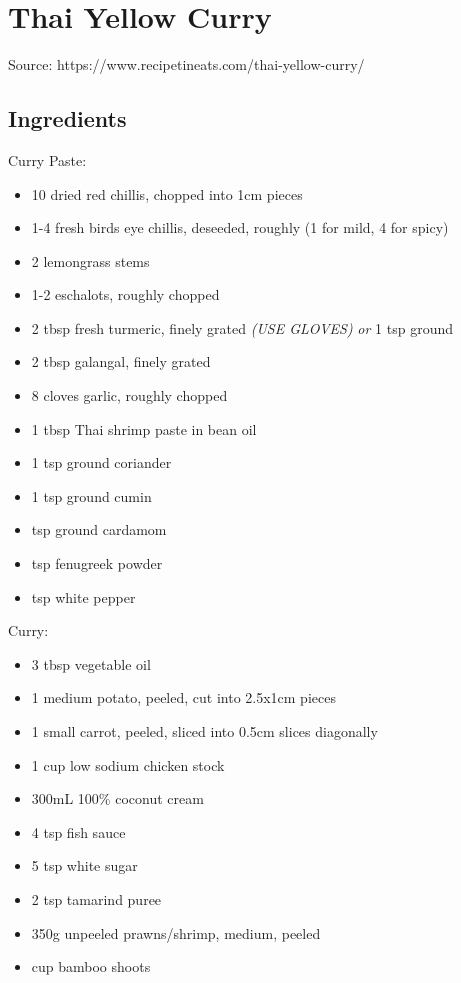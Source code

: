 \section{Thai Yellow Curry}

  
  Source: https://www.recipetineats.com/thai-yellow-curry/
    
  \subsection{Ingredients}
    
  Curry Paste:
  
  \begin{itemize}
    \item 10 dried red chillis, chopped into 1cm pieces
    \item 1-4 fresh birds eye chillis, deseeded, roughly (1 for mild, 4 for spicy)
    \item 2 lemongrass stems
    \item 1-2 eschalots, roughly chopped
    \item 2 tbsp fresh turmeric, finely grated \emph{(USE GLOVES)} \emph{or} 1  tsp ground
    \item 2 tbsp galangal, finely grated
    \item 8 cloves garlic, roughly chopped
    \item 1 tbsp Thai shrimp paste in bean oil
    \item 1 tsp ground coriander
    \item 1 tsp ground cumin
    \item {} tsp ground cardamom
    \item {} tsp fenugreek powder
    \item {} tsp white pepper
  \end{itemize}

  Curry:

  \begin{itemize}
    \item 3 tbsp vegetable oil
    \item 1 medium potato, peeled, cut into 2.5x1cm pieces
    \item 1 small carrot, peeled, sliced into 0.5cm slices diagonally
    \item 1 cup low sodium chicken stock
    \item 300mL 100\% coconut cream
    \item 4 tsp fish sauce
    \item 5 tsp white sugar
    \item 2 tsp tamarind puree
    \item 350g unpeeled prawns/shrimp, medium, peeled
    \item {} cup bamboo shoots
  \end{itemize}

